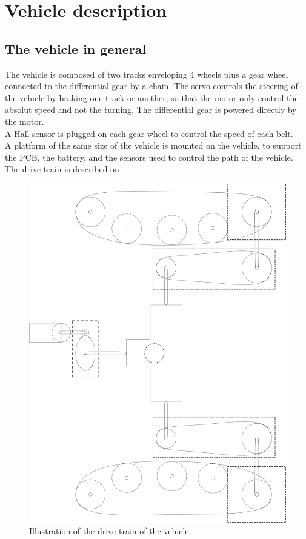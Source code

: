 \section{Vehicle description}

\subsection{The vehicle in general}

The vehicle is composed of two tracks enveloping 4 wheels plus a gear wheel connected to the differential gear by a chain. The servo controls the steering of the vehicle by braking one track or another, so that the motor only control the absolut speed and not the turning. The differential gear is powered directly by the motor.\\
A Hall sensor is plugged on each gear wheel to control the speed of each belt.\\
A platform of the same size of the vehicle is mounted on the vehicle, to support the PCB, the battery, and the sensors used to control the path of the vehicle.\\

The drive train is described on 



\begin{figure}[H]
	\centering
	\includegraphics[scale=0.2]{figures/vehicleDescriptionDriveTrain.pdf}
	\caption{Illustration of the drive train of the vehicle.}
	\label{vehicleDescriptionDriveTrain}
\end{figure}